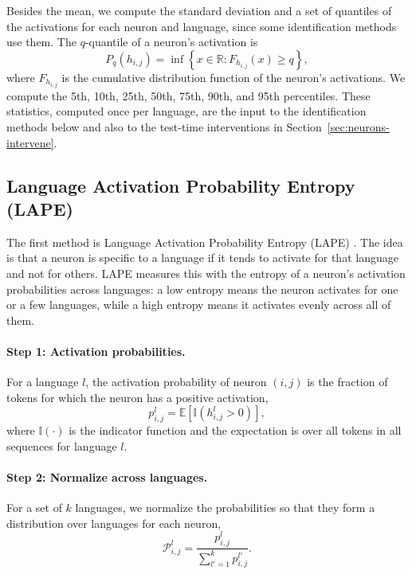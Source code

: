 Besides the mean, we compute the standard deviation and a set of quantiles of the
activations for each neuron and language, since some identification methods use
them. The $q$-quantile of a neuron's activation is
\begin{equation}
	P_q(h_{i,j}) = \inf\left\{ x \in \mathbb{R} : F_{h_{i,j}}(x) \geq q \right\},
	\label{eq:neurons-quantile}
\end{equation}
where $F_{h_{i,j}}$ is the cumulative distribution function of the neuron's
activations. We compute the 5th, 10th, 25th, 50th, 75th, 90th, and 95th
percentiles. These statistics, computed once per language, are the input to the
identification methods below and also to the test-time interventions in
Section~\ref{sec:neurons-intervene}.

\subsection{Language Activation Probability Entropy (LAPE)}
\label{subsec:neurons-lape}

The first method is Language Activation Probability Entropy (LAPE)
\citep{tang2024language}. The idea is that a neuron is specific to a language if it
tends to activate for that language and not for others. LAPE measures this with the
entropy of a neuron's activation probabilities across languages: a low entropy
means the neuron activates for one or a few languages, while a high entropy means
it activates evenly across all of them.

\paragraph{Step 1: Activation probabilities.}
For a language $l$, the activation probability of neuron $(i,j)$ is the fraction of
tokens for which the neuron has a positive activation,
\begin{equation}
	p^{l}_{i,j} = \mathbb{E}\left[ \mathbb{I}\!\left( h^{l}_{i,j} > 0 \right) \right],
	\label{eq:neurons-lape-prob}
\end{equation}
where $\mathbb{I}(\cdot)$ is the indicator function and the expectation is over all
tokens in all sequences for language $l$.

\paragraph{Step 2: Normalize across languages.}
For a set of $k$ languages, we normalize the probabilities so that they form a
distribution over languages for each neuron,
\begin{equation}
	\mathcal{P}^{l}_{i,j} = \frac{p^{l}_{i,j}}{\sum_{l'=1}^{k} p^{l'}_{i,j}}.
	\label{eq:neurons-lape-norm}
\end{equation}

